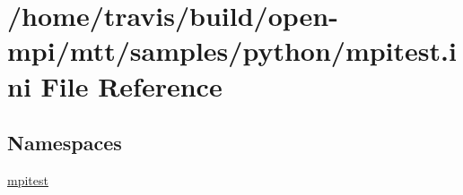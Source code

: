 \hypertarget{mpitest_8ini}{\section{/home/travis/build/open-\/mpi/mtt/samples/python/mpitest.ini File Reference}
\label{mpitest_8ini}
}
\subsection*{Namespaces}
\begin{DoxyCompactItemize}
\item 
\hyperlink{namespacempitest}{mpitest}
\end{DoxyCompactItemize}
